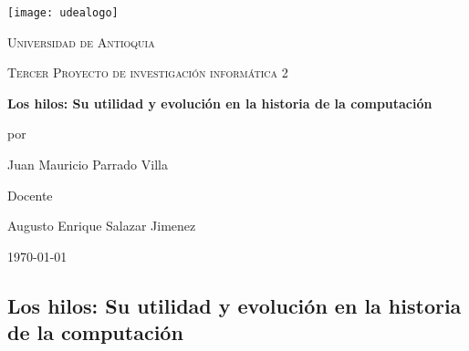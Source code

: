 \documentclass[12pt,a4paper]{report}
\begin{document}
   

    \begin{titlepage}

               \centering


               \texttt{[image: udealogo]}\par\vspace{1cm}

               {\scshape\LARGE Universidad de Antioquia \par}

               \vspace{1cm}

               {\scshape\large Tercer Proyecto de investigación informática 2\par}

               \vspace{1.5cm}

               {\Large\bfseries Los hilos: Su utilidad y evolución en la historia de la computación\par}

               \vspace{2cm}

               por\par

               {\Large Juan Mauricio Parrado Villa\par}


               \vspace{2cm}

               Docente\par

               {\Large Augusto Enrique Salazar Jimenez}


               \vfill


               {\large \today\par}

    \end{titlepage}

    \large

    \begin{center}

        \section*{Los hilos: Su utilidad y evolución en la historia de la computación}

    \end{center}
        
\end{document}
